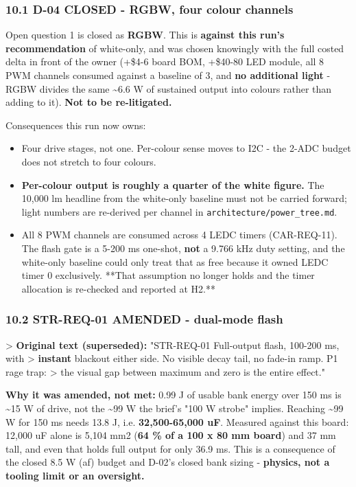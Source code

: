 \documentclass[11pt,a4paper]{article}
\begin{document}
\subsubsection*{10.1 D-04 CLOSED - RGBW, four colour channels}
Open question 1 is closed as \textbf{RGBW}. This is \textbf{against this run's recommendation} of white-only, and was chosen knowingly with the full costed delta in front of the owner (+\$4-6 board BOM, +\$40-80 LED module, all 8 PWM channels consumed against a baseline of 3, and \textbf{no additional light} - RGBW divides the same \textasciitilde{}6.6 W of sustained output into colours rather than adding to it). \textbf{Not to be re-litigated.}

Consequences this run now owns:

\begin{itemize}
\item Four drive stages, not one. Per-colour sense moves to I2C - the 2-ADC budget does not
stretch to four colours.
\item \textbf{Per-colour output is roughly a quarter of the white figure.} The 10,000 lm headline
from the white-only baseline must not be carried forward; light numbers are re-derived
per channel in \texttt{architecture/power\_tree.md}.
\item All 8 PWM channels are consumed across 4 LEDC timers (CAR-REQ-11). The flash gate is a
5-200 ms one-shot, \textbf{not} a 9.766 kHz duty setting, and the white-only baseline could
only treat that as free because it owned LEDC timer 0 exclusively. {*}{*}That assumption no
longer holds and the timer allocation is re-checked and reported at H2.{*}{*}
\end{itemize}
\subsubsection*{10.2 STR-REQ-01 AMENDED - dual-mode flash}
\textgreater{} \textbf{Original text (superseded):} "STR-REQ-01 \textbar{} Full-output flash, 100-200 ms, with \textgreater{} \textbf{instant} blackout either side. No visible decay tail, no fade-in ramp. \textbar{} P1 rage trap: \textgreater{} the visual gap between maximum and zero is the entire effect."

\textbf{Why it was amended, not met:} 0.99 J of usable bank energy over 150 ms is \textasciitilde{}15 W of drive, not the \textasciitilde{}99 W the brief's "100 W strobe" implies. Reaching \textasciitilde{}99 W for 150 ms needs 13.8 J, i.e. \textbf{32,500-65,000 uF}. Measured against this board: 12,000 uF alone is 5,104 mm2 (\textbf{64 \% of a 100 x 80 mm board}) and 37 mm tall, and even that holds full output for only 36.9 ms. This is a consequence of the closed 8.5 W (af) budget and D-02's closed bank sizing - \textbf{physics, not a tooling limit or an oversight.}
\end{document}
